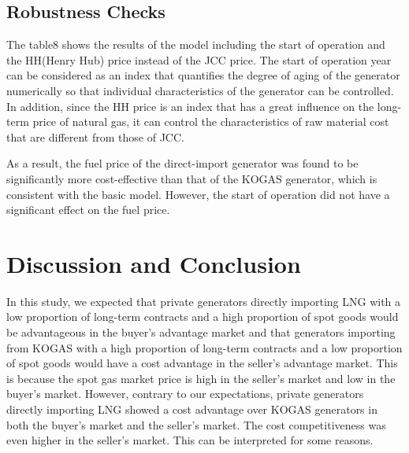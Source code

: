 \documentclass[12pt]{article}
\begin{document}
\subsection{Robustness Checks}


The table8 shows the results of the model including the start of operation and the HH(Henry Hub) price instead of the JCC price. The start of operation year can be considered as an index that quantifies the degree of aging of the generator numerically so that individual characteristics of the generator can be controlled. In addition, since the HH price is an index that has a great influence on the long-term price of natural gas, it can control the characteristics of raw material cost that are different from those of JCC. 

As a result, the fuel price of the direct-import generator was found to be significantly more cost-effective than that of the KOGAS generator, which is consistent with the basic model. However, the start of operation did not have a significant effect on the fuel price.































\newpage
\section{Discussion and Conclusion}
In this study, we expected that private generators directly importing LNG with a low proportion of long-term contracts and a high proportion of spot goods would be advantageous in the buyer's advantage market and that generators importing from KOGAS with a high proportion of long-term contracts and a low proportion of spot goods would have a cost advantage in the seller's advantage market. This is because the spot gas market price is high in the seller's market and low in the buyer's market. However, contrary to our expectations, private generators directly importing LNG showed a cost advantage over KOGAS generators in both the buyer's market and the seller's market. The cost competitiveness was even higher in the seller's market. This can be interpreted for some reasons.
\end{document}
